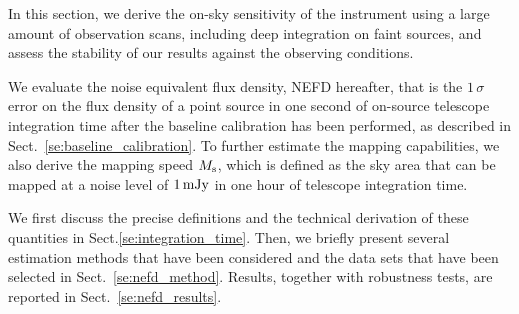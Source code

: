 
%

In this section, we derive the on-sky sensitivity of the instrument
using a large amount of observation scans, including deep integration
on faint sources, and assess the stability of our results against the
observing conditions.

We evaluate the noise equivalent flux density, NEFD hereafter, that is
the $1\,\sigma$ error on the flux
density of a point source in one second of on-source telescope
integration time after the baseline calibration has been performed, as
described in Sect.~\ref{se:baseline_calibration}. To further estimate
the mapping capabilities, we also derive the mapping speed
$M_{\rm{s}}$, which is defined as the sky area that can
be mapped at a noise level of $1\,\rm{mJy}$ in one hour of telescope 
integration time.

We first discuss the precise definitions and the technical derivation
of these quantities in Sect.\ref{se:integration_time}.
Then, we briefly present several estimation methods that have been
considered and the data sets that have been selected in
Sect.~\ref{se:nefd_method}.
Results, together with robustness tests, are reported in Sect.~\ref{se:nefd_results}.

